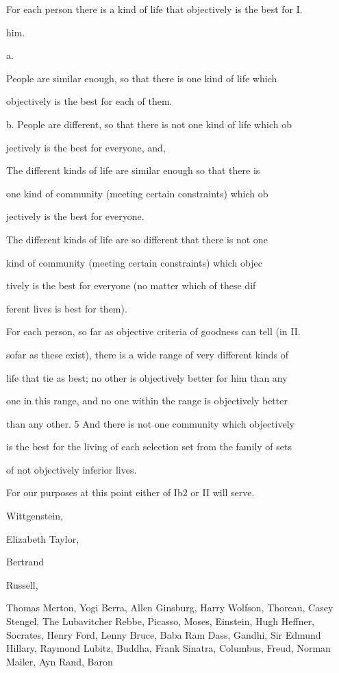 \documentclass[11pt,openany]{book}
\begin{document}
For each person there is a kind of life that objectively is the best for I. 

him. 

a. 

People are similar enough, so that there is one kind of life which 

objectively is the best for each of them. 

b. People are different, so that there is not one kind of life which ob

jectively is the best for everyone, and, 

The different kinds of life are similar enough so that there is 

one kind of community (meeting certain constraints) which ob

jectively is the best for everyone. 

The different kinds of life are so different that there is not one 

kind of community (meeting certain constraints) which objec

tively is the best for everyone (no matter which of these dif

ferent lives is best for them). 

For each person, so far as objective criteria of goodness can tell (in II. 

sofar as these exist), there is a wide range of very different kinds of 

life that tie as best; no other is objectively better for him than any 

one in this range, and no one within the range is objectively better 

than any other. 5 And there is not one community which objectively 

is the best for the living of each selection set from the family of sets 

of not objectively inferior lives. 

For our purposes at this point either of Ib2 or II will serve. 

Wittgenstein, 

Elizabeth Taylor, 

Bertrand 

Russell, 

Thomas Merton, Yogi Berra, Allen Ginsburg, Harry Wolfson, Thoreau, Casey Stengel, The Lubavitcher Rebbe, Picasso, Moses, Einstein, Hugh Heffner, Socrates, Henry Ford, Lenny Bruce, Baba Ram Dass, Gandhi, Sir Edmund Hillary, Raymond Lubitz, Buddha, Frank Sinatra, Columbus, Freud, Norman Mailer, Ayn Rand, Baron 
\end{document}
